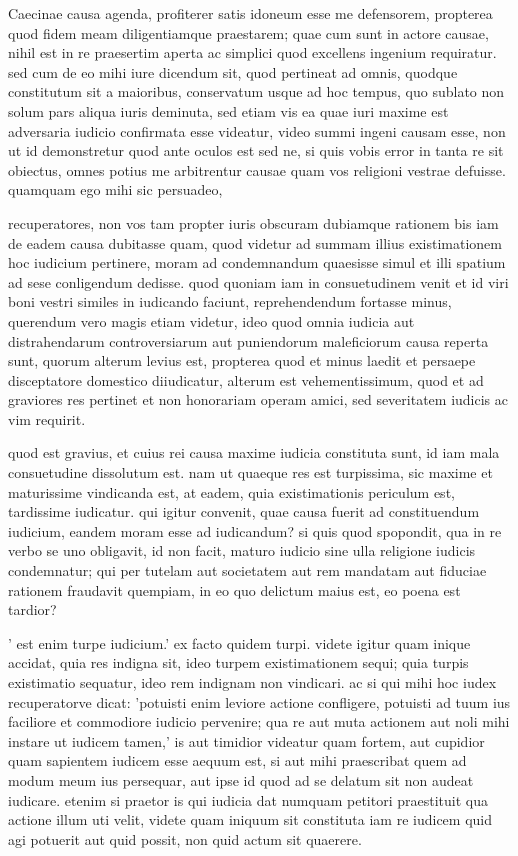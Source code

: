  Caecinae causa agenda, profiterer satis idoneum esse me defensorem, propterea quod fidem meam diligentiamque praestarem; quae cum sunt in actore causae, nihil est in re praesertim aperta ac simplici quod excellens ingenium requiratur. sed cum de eo mihi iure dicendum sit, quod pertineat ad omnis, quodque constitutum sit a maioribus, conservatum usque ad hoc tempus, quo sublato non solum pars aliqua iuris deminuta, sed etiam vis ea quae iuri maxime est adversaria iudicio confirmata esse videatur, video summi ingeni causam esse, non ut id demonstretur quod ante oculos est sed ne, si quis vobis error in tanta re sit obiectus, omnes potius me arbitrentur causae quam vos religioni vestrae defuisse. quamquam ego mihi sic persuadeo,

 recuperatores, non vos tam propter iuris obscuram dubiamque rationem bis iam de eadem causa dubitasse quam, quod videtur ad summam illius existimationem hoc iudicium pertinere, moram ad condemnandum quaesisse simul et illi spatium ad sese conligendum dedisse. quod quoniam iam in consuetudinem venit et id viri boni vestri similes in iudicando faciunt, reprehendendum fortasse minus, querendum vero magis etiam videtur, ideo quod omnia iudicia aut distrahendarum controversiarum aut puniendorum maleficiorum causa reperta sunt, quorum alterum levius est, propterea quod et minus laedit et persaepe disceptatore domestico diiudicatur, alterum est vehementissimum, quod et ad graviores res pertinet et non honorariam operam amici, sed severitatem iudicis ac vim requirit.

 quod est gravius, et cuius rei causa maxime iudicia constituta sunt, id iam mala consuetudine dissolutum est. nam ut quaeque res est turpissima, sic maxime et maturissime vindicanda est, at eadem, quia existimationis periculum est, tardissime iudicatur. qui igitur convenit, quae causa fuerit ad constituendum iudicium, eandem moram esse ad iudicandum? si quis quod spopondit, qua in re verbo se uno obligavit, id non facit, maturo iudicio sine ulla religione iudicis condemnatur; qui per tutelam aut societatem aut rem mandatam aut fiduciae rationem fraudavit quempiam, in eo quo delictum maius est, eo poena est tardior?

 ' est enim turpe iudicium.' ex facto quidem turpi. videte igitur quam inique accidat, quia res indigna sit, ideo turpem existimationem sequi; quia turpis existimatio sequatur, ideo rem indignam non vindicari. ac si qui mihi hoc iudex recuperatorve dicat: 'potuisti enim leviore actione confligere, potuisti ad tuum ius faciliore et commodiore iudicio pervenire; qua re aut muta actionem aut noli mihi instare ut iudicem tamen,' is aut timidior videatur quam fortem, aut cupidior quam sapientem iudicem esse aequum est, si aut mihi praescribat quem ad modum meum ius persequar, aut ipse id quod ad se delatum sit non audeat iudicare. etenim si praetor is qui iudicia dat numquam petitori praestituit qua actione illum uti velit, videte quam iniquum sit constituta iam re iudicem quid agi potuerit aut quid possit, non quid actum sit quaerere.

